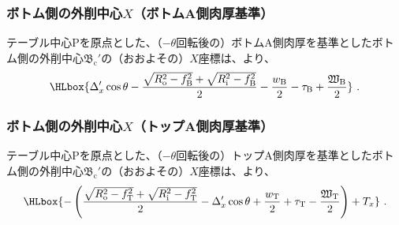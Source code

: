 \subsubsection{ボトム側の外削中心\texorpdfstring{$X$}{X}（ボトムA側肉厚基準）}
テーブル中心Pを原点とした、（$-\theta$回転後の）ボトムA側肉厚を基準としたボトム側の外削中心$\mathfrak B_\mathrm c'$の（おおよその）$X$座標は、より、
\begin{align*}
  \HLbox{%
    \Delta_x'\cos\theta
    -\frac{\sqrt{R_\mathrm o^2-f_\mathrm B^2}+\sqrt{R_\mathrm i^2-f_\mathrm B^2}}2
    -\frac{w_\mathrm B}2
    -\tau_\mathrm B
    +\frac{\mathfrak W_\mathrm B}2
  }\ .
\end{align*}

\subsubsection{ボトム側の外削中心\texorpdfstring{$X$}{X}（トップA側肉厚基準）}
テーブル中心Pを原点とした、（$-\theta$回転後の）トップA側肉厚を基準としたボトム側の外削中心$\mathfrak B_\mathrm c'$の（おおよその）$X$座標は、より、
\begin{align*}
  \HLbox{%
    -\left(
      \frac{\sqrt{R_\mathrm o^2-f_\mathrm T^2}+\sqrt{R_\mathrm i^2-f_\mathrm T^2}}2
      -\Delta_x'\cos\theta
      +\frac{w_\mathrm T}2
      +\tau_\mathrm T
      -\frac{\mathfrak W_\mathrm T}2
    \right)
    +T_x
  }\ .
\end{align*}



